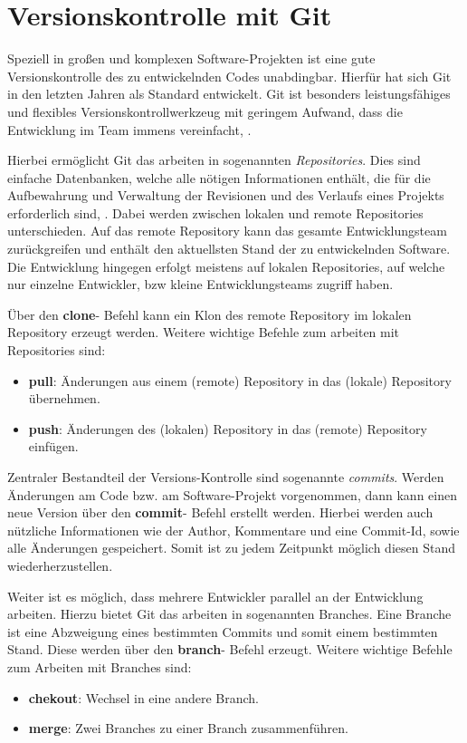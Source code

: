\chapter{Versionskontrolle mit Git}

Speziell in großen und komplexen Software-Projekten ist eine gute Versionskontrolle des zu entwickelnden Codes unabdingbar.
Hierfür hat sich Git in den letzten Jahren als Standard entwickelt. Git ist besonders leistungsfähiges und flexibles Versionskontrollwerkzeug mit geringem Aufwand, dass die Entwicklung im Team immens vereinfacht, \cite{Loeliger:2012}.

Hierbei ermöglicht Git das arbeiten in sogenannten \textit{Repositories}. Dies sind einfache Datenbanken, welche alle nötigen Informationen enthält, die für die Aufbewahrung und Verwaltung der Revisionen und des Verlaufs eines Projekts erforderlich sind, \cite{Loeliger:2012}. Dabei werden zwischen lokalen und remote Repositories unterschieden. Auf das remote Repository kann das gesamte Entwicklungsteam zurückgreifen und enthält den aktuellsten Stand der zu entwickelnden Software. Die Entwicklung hingegen erfolgt meistens auf lokalen Repositories, auf welche nur einzelne Entwickler, bzw kleine Entwicklungsteams zugriff haben.

Über den \textbf{clone}- Befehl kann ein Klon des remote Repository im lokalen Repository erzeugt werden.
Weitere wichtige Befehle zum arbeiten mit Repositories sind:
\begin{itemize}
	\item  \textbf{pull}:
	Änderungen aus einem (remote) Repository in das (lokale) Repository übernehmen.
	\item  \textbf{push}:
	Änderungen des (lokalen) Repository in das (remote) Repository einfügen.
\end{itemize}

Zentraler Bestandteil der Versions-Kontrolle sind sogenannte \textit{commits}. Werden Änderungen am Code bzw. am Software-Projekt vorgenommen, dann kann einen neue Version über den \textbf{commit}- Befehl erstellt werden. Hierbei werden auch nützliche Informationen wie der Author, Kommentare und eine Commit-Id, sowie alle Änderungen gespeichert. Somit ist zu jedem Zeitpunkt möglich diesen Stand wiederherzustellen.

Weiter ist es möglich, dass mehrere Entwickler parallel an der Entwicklung arbeiten. Hierzu bietet Git das arbeiten in sogenannten Branches. Eine Branche ist eine Abzweigung eines bestimmten Commits und somit einem bestimmten Stand. Diese werden über den \textbf{branch}- Befehl erzeugt. Weitere wichtige Befehle zum Arbeiten mit Branches sind:
\begin{itemize}
	\item  \textbf{chekout}:
	Wechsel in eine andere Branch.
	\item  \textbf{merge}:
	Zwei Branches zu einer Branch zusammenführen.
\end{itemize}  

